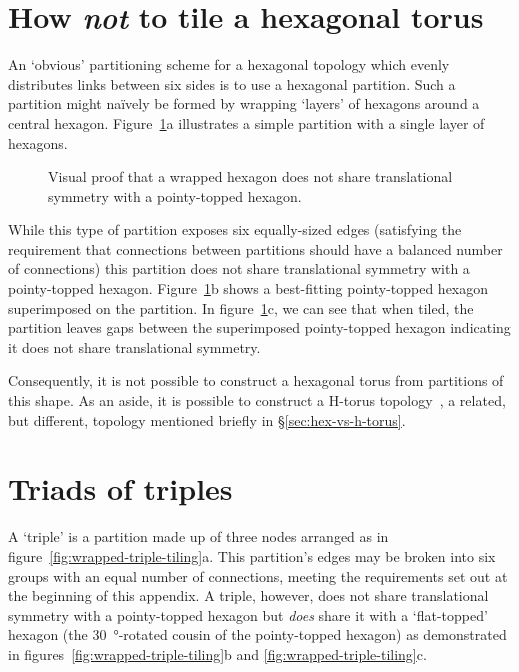 	
	\section{How \emph{not} to tile a hexagonal torus}
	
		An `obvious' partitioning scheme for a hexagonal topology which evenly
		distributes links between six sides is to use a hexagonal partition. Such a
		partition might na\"ively be formed by wrapping `layers' of hexagons around
		a central hexagon. Figure~\ref{fig:wrapped-hexagon-tiling}a illustrates a
		simple partition with a single layer of hexagons.
		
		\begin{figure}
			\center
			
			\caption[A wraped hexagon does not tile a hexagonal torus.]%
			{Visual proof that a wrapped hexagon does not share translational
			symmetry with a pointy-topped hexagon.}
			\label{fig:wrapped-hexagon-tiling}
		\end{figure}
	
		While this type of partition exposes six equally-sized edges (satisfying
		the requirement that connections between partitions should have a balanced
		number of connections) this partition does not share translational symmetry
		with a pointy-topped hexagon. Figure~\ref{fig:wrapped-hexagon-tiling}b
		shows a best-fitting pointy-topped hexagon superimposed on the partition.
		In figure~\ref{fig:wrapped-hexagon-tiling}c, we can see that when tiled,
		the partition leaves gaps between the superimposed pointy-topped hexagon
		indicating it does not share translational symmetry.
		
		Consequently, it is not possible to construct a hexagonal torus from
		partitions of this shape. As an aside, it is possible to construct a
		H-torus topology~\cite{zhao08}, a related, but different, topology
		mentioned briefly in \S\ref{sec:hex-vs-h-torus}.
	
	\section{Triads of triples}
		
		A `triple' is a partition made up of three nodes arranged as in
		figure~\ref{fig:wrapped-triple-tiling}a. This partition's edges may be
		broken into six groups with an equal number of connections, meeting the
		requirements set out at the beginning of this appendix. A triple, however,
		does not share translational symmetry with a pointy-topped hexagon but
		\emph{does} share it with a `flat-topped' hexagon (the
		\SI{30}{\degree}-rotated cousin of the pointy-topped hexagon) as
		demonstrated in figures~\ref{fig:wrapped-triple-tiling}b and
		\ref{fig:wrapped-triple-tiling}c.
		
